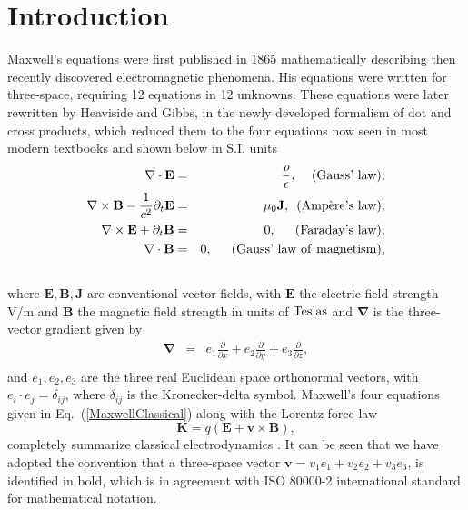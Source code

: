 \documentclass[12pt,aps,prb,preprint]{revtex4}   %
\newcommand{\be}{\begin{equation}}
\newcommand{\ee}{\end{equation}}
\newcommand{\bea}{\begin{eqnarray}}
\newcommand{\eea}{\end{eqnarray}}
\begin{document}
\section{Introduction}

Maxwell's equations were first published in 1865 \cite{Maxwell:1865} mathematically describing then recently discovered electromagnetic phenomena.  His equations were written for three-space, requiring 12 equations in 12 unknowns. These equations were later rewritten by Heaviside and Gibbs, in the newly developed formalism of dot and cross products, which reduced them to the four equations now seen in most modern textbooks  \cite{Griffiths:1999} and shown below in S.I. units
\bea \label{MaxwellClassical}
\mathbf{\nabla} \cdot \mathbf{E} & = & \frac{\rho}{\epsilon},   \,\,\,\,\,\,\, \rm{(Gauss\text{'} \,\, law)} ; \\ \nonumber
\mathbf{\nabla} \times \mathbf{B} - \frac{1}{c^2} \partial_t \textbf{E} & = & \mu_0 \mathbf{J},  \,\,\,  \rm{(Amp\grave{e}re\text{'}s \,\, law)} ; \\ \nonumber
\mathbf{\nabla} \times \mathbf{E} +  \partial_t \mathbf{B}  & = &  0 , \,\,\,\,\,\,\,\,\, \rm{(Faraday\text{'}s \,\, law)} ; \\ \nonumber
\mathbf{\nabla} \cdot \mathbf{B}  & = &  0 , \,\,\,  \,\,\,  \,\,\,  \rm{(Gauss\text{'} \,\, law \,\, of \,\, magnetism)} ,  \\ \nonumber
\eea
where $ \mathbf{E} , \mathbf{B},\mathbf{J} $ are conventional vector fields, with $ \mathbf{E} $  the electric field strength V/m and $ \mathbf{B} $ the magnetic field strength in units of $\rm{Teslas}$ and $ \mathbf{\nabla} $ is the three-vector gradient given by
\bea
\mathbf{\nabla} & = & e_1 \frac{\partial}{\partial x} + e_2 \frac{\partial}{\partial y} + e_3 \frac{\partial}{\partial z} , \\ \nonumber
\eea
and $ e_1, e_2, e_3 $ are the three real Euclidean space orthonormal vectors, with $ e_i \cdot e_j = \delta_{ij} $, where $ \delta_{ij} $ is the Kronecker-delta symbol.
Maxwell's four equations given in Eq.~(\ref{MaxwellClassical}) along with the Lorentz force law
\be \label{LorentzForceLaw}
\mathbf{K} = q (\mathbf{E}+\mathbf{v} \times \mathbf{B}),
\ee
completely summarize classical electrodynamics \cite{Griffiths:1999}.   It can be seen that we have adopted the convention that a three-space vector $ \textbf{v} = v_1 e_1 + v_2 e_2 + v_3 e_3 $, is identified in bold, which is in agreement with ISO 80000-2 international standard for mathematical notation. 
\end{document}
